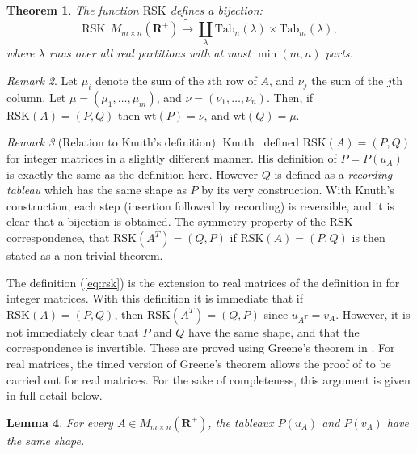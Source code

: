 \documentclass[10pt]{amsproc}
\newtheorem{theorem}{Theorem}[subsection]
\newtheorem{lemma}[theorem]{Lemma}
\theoremstyle{definition}
\theoremstyle{remark}
\newtheorem{remark}[theorem]{Remark}
\newcommand{\Tab}{\mathrm{Tab}}
\newcommand{\wt}{\mathrm{wt}}
\newcommand{\rp}{\mathbf{R}^+}
\newcommand{\rsk}{\mathrm{RSK}}
\begin{document}
\begin{theorem}
  \label{theorem:rsk}
  The function $\rsk$ defines a bijection:
  \begin{displaymath}
    \rsk: M_{m\times n}(\rp)\tilde\to \coprod_\lambda \Tab_n(\lambda)\times\Tab_m(\lambda),
  \end{displaymath}
  where $\lambda$ runs over all real partitions with at most $\min(m,n)$ parts.
\end{theorem}
\begin{remark}
  Let $\mu_i$ denote the sum of the $i$th row of $A$, and $\nu_j$ the sum of the $j$th column.
  Let $\mu=(\mu_1,\dotsc,\mu_m)$, and $\nu=(\nu_1,\dotsc,\nu_n)$.
  Then, if $\rsk(A)=(P,Q)$ then $\wt(P)=\nu$, and $\wt(Q)=\mu$.
\end{remark}
\begin{remark}[Relation to Knuth's definition]
  Knuth~\cite{knuth} defined $\rsk(A)=(P,Q)$ for integer matrices in a slightly different manner.
  His definition of $P=P(u_A)$ is exactly the same as the definition here.
  However $Q$ is defined as a \emph{recording tableau} which has the same shape as $P$ by its very construction.
  With Knuth's construction, each step (insertion followed by recording) is reversible, and it is clear that a bijection is obtained.
  The symmetry property of the RSK correspondence, that $\rsk(A^T)=(Q,P)$ if $\rsk(A)=(P,Q)$ is then stated as a non-trivial theorem.

  The definition (\ref{eq:rsk}) is the extension to real matrices of the definition in \cite[Section~18]{schur_poly} for integer matrices.
  With this definition it is immediate that if $\rsk(A)=(P,Q)$, then $\rsk(A^T)=(Q,P)$ since $u_{A^T}=v_A$.
  However, it is not immediately clear that $P$ and $Q$ have the same shape, and that the correspondence is invertible.
  These are proved using Greene's theorem in \cite{schur_poly}.
  For real matrices, the timed version of Greene's theorem allows the proof of \cite{schur_poly} to be carried out for real matrices.
  For the sake of completeness, this argument is given in full detail below.
\end{remark}
\begin{lemma}
  For every $A\in M_{m\times n}(\rp)$, the tableaux $P(u_A)$ and $P(v_A)$ have the same shape.
\end{lemma}
\end{document}
